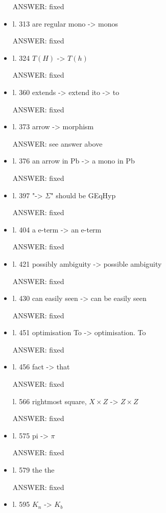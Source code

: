 \documentclass[english,11pt,a4paper]{article}
\begin{document}
\begin{itemize}
ANSWER: fixed

\item l. 313 are regular mono -> monos

ANSWER: fixed

\item l. 324 $T(H)$ -> $T(h)$

ANSWER: fixed

\item l. 360 extends -> extend
ito -> to

ANSWER: fixed

\item l. 373 arrow -> morphism

ANSWER: see answer above

\item l. 376 an arrow in Pb -> a mono in Pb

ANSWER: fixed

\item l. 397 "-> $\Sigma$" should be GEqHyp

ANSWER: fixed



\item l. 404 a e-term -> an e-term

ANSWER: fixed


\item l. 421 possibly ambiguity -> possible ambiguity

ANSWER: fixed


\item l. 430 can easily seen -> can be easily seen

ANSWER: fixed


\item l. 451 optimisation To -> optimisation. To

ANSWER: fixed


\item l. 456 fact -> that

ANSWER: fixed


l. 566 rightmost square, $X\times Z$ -> $Z\times Z$

ANSWER: fixed


\item l. 575 pi -> $\pi$

ANSWER: fixed


\item l. 579 the the

ANSWER: fixed


\item l. 595 $K_n$ -> $K_b$


\end{itemize}
\end{document}
